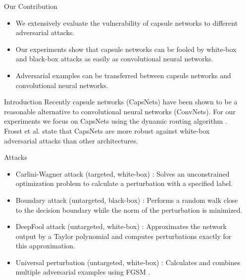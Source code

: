 \documentclass[final]{beamer}
\newlength{\sepwid}
\newlength{\onecolwid}
\begin{document}
	\begin{frame}[t] %
	
	\begin{columns}[t] %
		
		\begin{column}{\sepwid}\end{column} %
		
		\begin{column}{\onecolwid} %
			
			\begin{alertblock}{Our Contribution}
				
				\begin{itemize}
					\item We extensively evaluate the vulnerability of capsule networks to different adversarial attacks.
					\item Our experiments show that capsule networks can be fooled by white-box and black-box attacks as easily as convolutional neural networks.
					\item Adversarial examples can be transferred between capsule networks and convolutional neural networks.
				\end{itemize}
				
			\end{alertblock}
			
			\begin{block}{Introduction}
				Recently capsule networks (CapsNets) \cite{capsules}
				have been shown to be a reasonable alternative to convolutional neural
				networks (ConvNets). For our experiments we focus on CapsNets using the dynamic routing algorithm \cite{capsules}. Frosst et al. \cite{darccc} state that CapsNets
				are more robust against white-box adversarial attacks than other
				architectures. 
			\end{block}
		
			\begin{block}{Attacks}
				\begin{itemize}
					\item Carlini-Wagner attack (targeted, white-box) \cite{carlini}: Solves an unconstrained optimization problem to calculate a perturbation with a specified label.
					\item Boundary attack (untargeted, black-box) \cite{boundary}: Performs a random walk close to the
					decision boundary while the norm of the perturbation is minimized.
					\item DeepFool attack (untargeted, white-box) \cite{deepfool}: Approximates the network output by a Taylor polynomial and computes perturbations exactly for this approximation.
					\item Universal perturbation (untargeted, white-box) \cite{universal}: Calculates and combines multiple adversarial examples using FGSM \cite{fgsm}.
				\end{itemize}
			\end{block}
			

\end{column}
\end{columns}
\end{frame}
\end{document}
